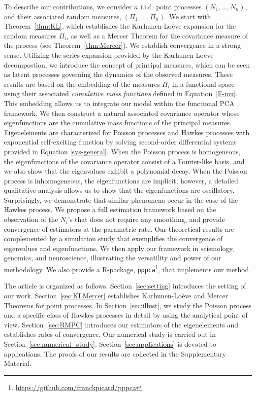 \documentclass[aos]{imsart}
\theoremstyle{plain}
\theoremstyle{remark}
\newcommand{\1}{1}
\begin{document}
To describe our contributions, we consider $n$ i.i.d. point processes $(N_1, \ldots, N_n)$,  and their associated random measures, $(\Pi_1,\ldots,\Pi_n)$. We start with Theorem~\ref{thm:KL}, which establishes the Karhunen-Lo\`eve expansion for the random measures $\Pi_i$, as well as a Mercer Theorem for the covariance measure of the process (see Theorem~\ref{thm:Mercer}).  We establish convergence in a strong sense. Utilizing the series expansion provided by the  Karhunen-Lo\`eve decompostion, we introduce the concept of principal measures, which can be seen as latent processes governing the dynamics of the observed measures. These results are based on the embedding of the measures $\Pi_i$ in a functional space using their associated \emph{cumulative mass functions} defined in Equation~\eqref{F-mu}. This embedding allows us to integrate our model within the functional PCA framework. We then construct a natural associated covariance operator whose eigenfunctions are the cumulative mass functions of the principal measures. Eigenelements are characterized for Poisson processes and Hawkes processes with exponential self-exciting function by solving second-order differential systems provided in Equation \eqref{sys-general}. When the Poisson process is homogeneous, the eigenfunctions of the covariance operator consist of a Fourier-like basis, and we also show that the eigenvalues exhibit a polynomial decay. When the Poisson process is inhomogeneous, the eigenfunctions are implicit; however, a detailed qualitative analysis allows us to show that the eigenfunctions are oscillatory. Surprisingly, we demonstrate that similar phenomena occur in the case of the Hawkes process. We propose a full estimation framework based on the observation of the $N_i$'s that does not require any smoothing, and provide convergence of estimators at the parametric rate. Our theoretical results are complemented by a simulation study that exemplifies the convergence of eigenvalues and eigenfunctions. We then apply our framework in seismology, genomics, and neuroscience, illustrating the versatility and power of our methodology. We also provide a R-package, \texttt{pppca}\footnote{\url{https://github.com/franckpicard/pppca}}, that implements our method.

The article is organized as follows. Section~\ref{sec:setting} introduces the setting of our work. Section~\ref{sec:KLMercer} establishes Karhunen-Lo\`eve and Mercer Theorems  for point processes. In Section~\ref{sec:illust}, we study the Poisson process and a specific class of Hawkes processes in detail by using the analytical point of view. Section~\ref{sec:RMPC} introduces our estimators of the eigenelements and establishes rates of convergence. Our numerical study is carried out in Section~\ref{sec:numerical_study}. Section~\ref{sec:applications} is devoted to applications. The proofs of our results are collected in the Supplementary Material.
\end{document}
